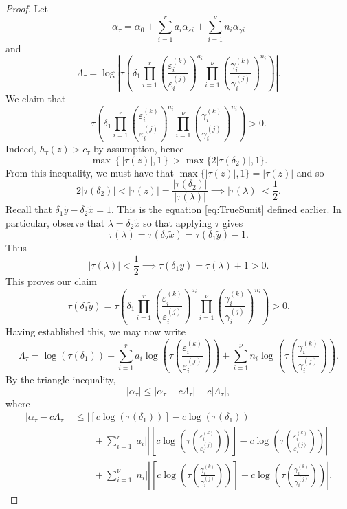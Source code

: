 \documentclass[11pt]{report}
\theoremstyle{definition}
\begin{document}
\begin{proof}
Let
\[\alpha_{\tau} = \alpha_0+\sum_{i = 1}^r a_i \alpha_{\varepsilon i} + \sum_{i = 1}^{\nu} n_i \alpha_{\gamma i}\]
and
\[\Lambda_{\tau} = \log\left|\tau\left(\delta_1 \prod_{i = 1}^r\left( \frac{\varepsilon_i^{(k)}}{\varepsilon_i^{(j)}}\right)^{a_i}\prod_{i = 1}^{\nu} \left( \frac{\gamma_i^{(k)}}{\gamma_i^{(j)}}\right)^{n_i}\right)\right|.\]
We claim that
\[\tau\left(\delta_1 \prod_{i = 1}^r\left( \frac{\varepsilon_i^{(k)}}{\varepsilon_i^{(j)}}\right)^{a_i}\prod_{i = 1}^{\nu} \left( \frac{\gamma_i^{(k)}}{\gamma_i^{(j)}}\right)^{n_i}\right) > 0.\]
Indeed, $h_{\tau}(z) > c_\tau$ by assumption, hence
\[\max \left\{|\tau(z)|, 1\right\}  > \max\{2|\tau(\delta_2)|,1\}.\]
From this inequality, we must have that $\max \{|\tau(z)|,1\} = |\tau(z)|$ and so
\[2|\tau(\delta_2)| < |\tau(z)| = \frac{|\tau(\delta_2)|}{|\tau(\lambda)|} \implies |\tau(\lambda)| < \frac{1}{2}.\]
Recall that $\delta_1\tilde{y} - \delta_2\tilde{x} = 1$. This is the equation \eqref{eq:TrueSunit} defined earlier. In particular, observe that $\lambda = \delta_2\tilde{x}$ so that applying $\tau$ gives
\[\tau(\lambda) = \tau(\delta_2\tilde{x}) = \tau(\delta_1\tilde{y}) - 1.\]
Thus
\[|\tau(\lambda)| < \frac{1}{2} \implies \tau(\delta_1\tilde{y}) = \tau(\lambda) + 1 > 0.\]
This proves our claim
\[\tau(\delta_1\tilde{y}) = \tau\left(\delta_1 \prod_{i = 1}^r\left( \frac{\varepsilon_i^{(k)}}{\varepsilon_i^{(j)}}\right)^{a_i}\prod_{i = 1}^{\nu} \left( \frac{\gamma_i^{(k)}}{\gamma_i^{(j)}}\right)^{n_i}\right) > 0.\]
Having established this, we may now write
\[\Lambda_{\tau} = \log\left(\tau\left(\delta_1\right)\right) + \sum_{i=1}^r a_i\log\left(\tau\left( \frac{\varepsilon_i^{(k)}}{\varepsilon_i^{(j)}}\right) \right) + \sum_{i=1}^{\nu}n_i\log \left(\tau\left( \frac{\gamma_i^{(k)}}{\gamma_i^{(j)}}\right)\right).\]
By the triangle inequality,
\[|\alpha_{\tau}| \leq |\alpha_{\tau} - c\Lambda_{\tau}| + c|\Lambda_{\tau}|,\]
where
\begin{align*}
|\alpha_{\tau}-c\Lambda_\tau|
	& \leq \left| [c\log(\tau(\delta_1))] - c\log\left(\tau\left(\delta_1\right)\right)\right| \\
	& \quad \quad  + \sum_{i = 1}^r |a_i|\left| \left[c\log\left(\tau\left(\frac{\varepsilon_i^{(k)}}{\varepsilon_i^{(j)}}\right)\right)\right] - c\log\left(\tau\left( \frac{\varepsilon_i^{(k)}}{\varepsilon_i^{(j)}}\right) \right)\right|\\
	& \quad \quad +  \sum_{i = 1}^{\nu} |n_i|\left| \left[c\log\left(\tau\left(\frac{\gamma_i^{(k)}}{\gamma_i^{(j)}}\right)\right)\right] - c\log \left(\tau\left( \frac{\gamma_i^{(k)}}{\gamma_i^{(j)}}\right)\right)\right|.

\end{align*}
\end{proof}
\end{document}
